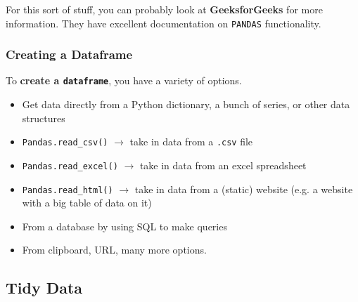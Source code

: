 \documentclass[english, 10pt]{article}
\begin{document}
\hfill \break For this sort of stuff, you can probably look at \textbf{GeeksforGeeks} for more information. They have excellent documentation on \texttt{PANDAS} functionality.

\subsubsection{Creating a Dataframe}

To \textbf{create a \texttt{dataframe}}, you have a variety of options.

\begin{itemize}
	\item Get data directly from a Python dictionary, a bunch of series, or other data structures
	\item \texttt{Pandas.read\_csv()} $\rightarrow$ take in data from a \texttt{.csv} file
	\item \texttt{Pandas.read\_excel()} $\rightarrow$ take in data from an excel spreadsheet
	\item \texttt{Pandas.read\_html()} $\rightarrow$ take in data from a (static) website (e.g. a website with a big table of data on it)
	\item From a database by using SQL to make queries
	\item From clipboard, URL, many more options.
\end{itemize}

\subsection{Tidy Data}
\end{document}

